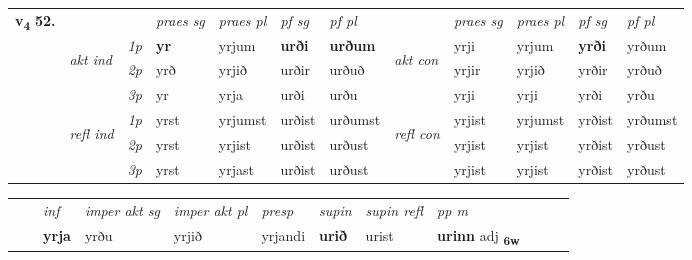 \begin{tabular}{llllllllllll} \toprule
\multirow{4}{*}{{{\textbf{v{\textsubscript{4}}} \Large{\textbf{52.}}}}}  & &   &  \textit{praes sg}  & \textit{praes pl}  &\textit{ pf sg} & \textit{pf pl} &  &  \textit{praes sg}  & \textit{praes pl}  & \textit{pf sg} & \textit{pf pl } \\*
	\cmidrule{4-7} \cmidrule{9-12}
 & \multirow{3}{*}{\begin{turn}{90}\textit{akt ind}\end{turn}} & {\textit{1p}} & \textbf{yr} & yrjum    & \textbf{urði} & \textbf{urðum} & \multirow{3}{*}{\begin{turn}{90}\textit{akt con}\end{turn}} &yrji & yrjum & \textbf{yrði} & yrðum\\*
& &  {\textit{2p}} &  yrð  & yrjið   & urðir & urðuð & & yrjir & yrjið & yrðir & yrðuð \\*
& &  {\textit{3p}} & yr & yrja   & urði & urðu & & yrji & yrji& yrði & yrðu  \\*
\cmidrule{4-7} \cmidrule{9-12}
 &\multirow{3}{*}{\begin{turn}{90}\textit{refl ind}\end{turn}} & {\textit{1p}} & yrst & yrjumst    & urðist & urðumst & \multirow{3}{*}{\begin{turn}{90}\textit{refl con}\end{turn}}  &yrjist & yrjumst & yrðist & yrðumst\\*
 &&  {\textit{2p}} &  yrst  & yrjist   & urðist & urðust & &yrjist & yrjist & yrðist & yrðust \\*
& &  {\textit{3p}} & yrst & yrjast   & urðist & urðust & & yrjist & yrjist& yrðist & yrðust  \\*
\cmidrule{4-7} \cmidrule{9-12}
\end{tabular}


\begin{tabular}{llllllllllll}
 & & \textit{inf} & \textit{imper akt sg} & \textit{imper akt pl}   & \textit{presp} & \textit{supin} & \textit{supin refl} & \textit{pp m}     \\*
  & & \textbf{yrja} & yrðu  & yrjið   & yrjandi &  \textbf{urið} & urist & \textbf{urinn} adj \textbf{\textsubscript{6w}} \\*
\cmidrule{1-12}
\end{tabular}



